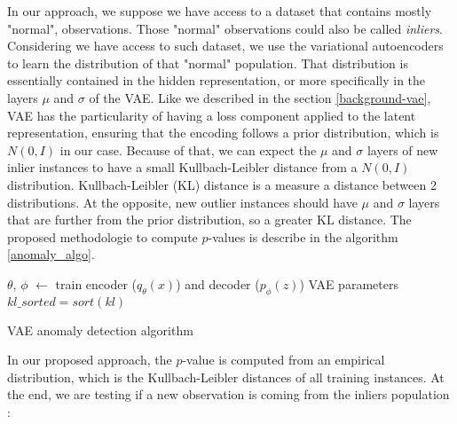\documentclass{article}
\begin{document}
In our approach, we suppose we have access to a dataset that contains mostly "normal", observations. Those "normal" observations could also be called \textit{inliers}. Considering we have access to such dataset, we use the variational autoencoders to learn the distribution of that "normal" population. That distribution is essentially contained in the hidden representation, or more specifically in the layers $\mu$ and $\sigma$ of the VAE. Like we described in the section \ref{background-vae}, VAE has the particularity of having a loss component applied to the latent representation, ensuring that the encoding follows a prior distribution, which is $N(0, I)$ in our case. Because of that, we can expect the $\mu$ and $\sigma$ layers of new inlier instances to have a small Kullbach-Leibler distance from a $N(0, I)$ distribution. Kullbach-Leibler (KL) distance is a measure a distance between 2 distributions. At the opposite, new outlier instances should have $\mu$ and $\sigma$ layers that are further from the prior distribution, so a greater KL distance. The proposed methodologie to compute $p$-values is describe in the algorithm \ref{anomaly_algo}.
\newline

\begin{center}
	\begin{algorithm}[H] \label{anomaly_algo}
		\SetAlgoLined
	$\theta$, $\phi$ $\leftarrow$ train encoder ($q_{\theta}(x)$) and decoder ($p_{\phi}(z)$) VAE parameters\;
		$kl\_sorted = sort(kl)$\;
		\caption{VAE anomaly detection algorithm}
	\end{algorithm}
\end{center}

In our proposed approach, the $p$-value is computed from an empirical distribution, which is the Kullbach-Leibler distances of all training instances. At the end, we are testing if a new observation is coming from the inliers population :
\end{document}
